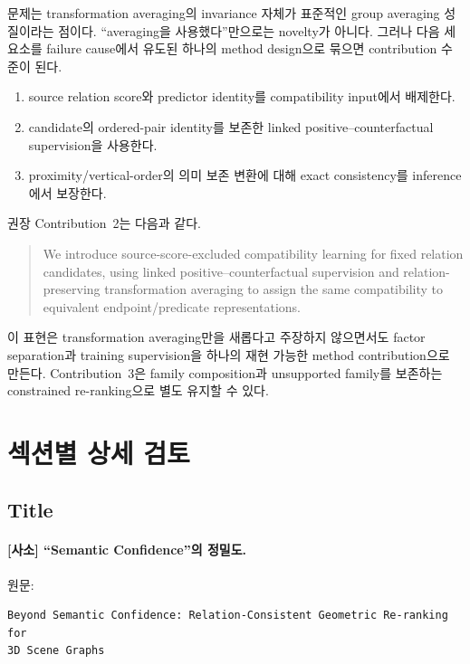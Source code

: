\documentclass[11pt]{article}
\newcommand{\minor}{\textbf{\textcolor{minorblue}{[사소]}}}
\begin{document}
문제는 transformation averaging의 invariance 자체가 표준적인 group averaging
성질이라는 점이다. ``averaging을 사용했다''만으로는 novelty가 아니다. 그러나
다음 세 요소를 failure cause에서 유도된 하나의 method design으로 묶으면 contribution
수준이 된다.

\begin{enumerate}[leftmargin=2em]
    \item source relation score와 predictor identity를 compatibility input에서
    배제한다.
    \item candidate의 ordered-pair identity를 보존한 linked positive--counterfactual
    supervision을 사용한다.
    \item proximity/vertical-order의 의미 보존 변환에 대해 exact consistency를
    inference에서 보장한다.
\end{enumerate}

권장 Contribution~2는 다음과 같다.

\begin{quote}
We introduce source-score-excluded compatibility learning for fixed relation
candidates, using linked positive--counterfactual supervision and
relation-preserving transformation averaging to assign the same compatibility
to equivalent endpoint/predicate representations.
\end{quote}

이 표현은 transformation averaging만을 새롭다고 주장하지 않으면서도 factor
separation과 training supervision을 하나의 재현 가능한 method contribution으로
만든다. Contribution~3은 family composition과 unsupported family를 보존하는 constrained
re-ranking으로 별도 유지할 수 있다.

\section{섹션별 상세 검토}

\subsection{Title}

\paragraph{\minor{} ``Semantic Confidence''의 정밀도.}

원문:
\begin{verbatim}
Beyond Semantic Confidence: Relation-Consistent Geometric Re-ranking for
3D Scene Graphs
\end{verbatim}
\end{document}
